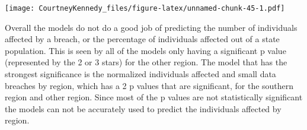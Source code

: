 \documentclass[
]{article}
\begin{document}
\texttt{[image: CourtneyKennedy\_files/figure-latex/unnamed-chunk-45-1.pdf]}

Overall the models do not do a good job of predicting the number of
individuals affected by a breach, or the percentage of individuals
affected out of a state population. This is seen by all of the models
only having a significant p value (represented by the 2 or 3 stars) for
the other region. The model that has the strongest significance is the
normalized individuals affected and small data breaches by region, which
has a 2 p values that are significant, for the southern region and other
region. Since most of the p values are not statistically significant the
models can not be accurately used to predict the individuals affected by
region.
\end{document}
